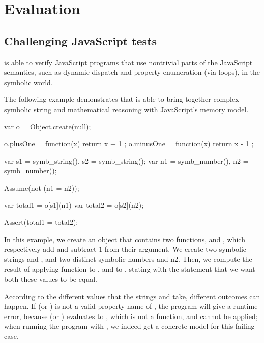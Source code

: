 
\section{Evaluation}

\subsection{Challenging JavaScript tests}

\cosette is able to verify JavaScript programs that use nontrivial parts of the JavaScript semantics, such as dynamic dispatch and property enumeration (via  loops), in the symbolic world.

The following example demonstrates that \cosette is able to bring together complex symbolic string and mathematical reasoning with JavaScript's memory model.

\begin{lstjs}
var o = Object.create(null);

o.plusOne = function(x) { return x + 1 };
o.minusOne = function(x) { return x - 1 };

var s1 = symb_string(), s2 = symb_string();
var n1 = symb_number(), n2 = symb_number();

Assume(not (n1 = n2));

var total1 = o[s1](n1)
var total2 = o[s2](n2);

Assert(total1 = total2);
\end{lstjs}

In this example, we create an object  that contains two functions,  and , which respectively add and subtract $1$ from their argument.
We create two symbolic strings  and , and two distinct symbolic numbers  and {n2}.
Then, we compute the result of applying function  to , and  to , stating with the  statement that we want both these values to be equal.

According to the different values that the strings  and  take,  different outcomes can happen.
If  (or ) is not a valid property name of , the program will give a runtime error, because  (or ) evaluates to , which is not a function, and cannot be applied; when running the program with \cosette, we indeed get a concrete model for this failing case.

